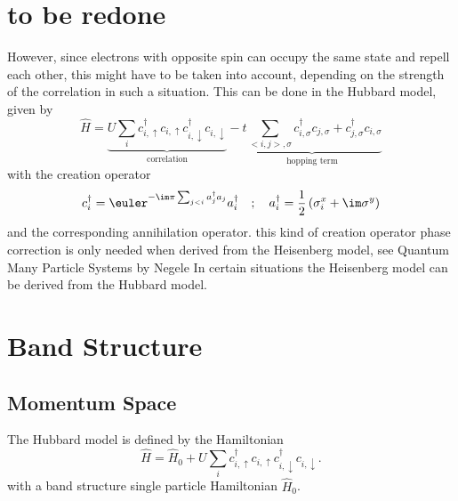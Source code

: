 \documentclass[a4paper,10pt]{report}
\begin{document}
\section{to be redone}

However, since electrons with opposite spin can occupy the same state and repell each other, this might have to be taken into account, depending on the 
strength of the correlation in such a situation. 
This can be done in the Hubbard model, given by
\begin{equation}
 \hat{H} = \underbrace{U \sum_i c^{\dagger}_{i,\uparrow}c_{i,\uparrow} c^{\dagger}_{i,\downarrow}c_{i,\downarrow} }_{\text{correlation}}
	    -\underbrace{t \sum_{<i,j>,\sigma} c^{\dagger}_{i,\sigma}c_{j,\sigma} + c^{\dagger}_{j,\sigma}c_{i,\sigma} }_{\text{hopping term}}
\end{equation}
with the creation operator 
\begin{equation}
 c^{\dagger}_{i} = \euler^{-\im\pi \sum_{j<i} a^{\dagger}_j a_j } a^{\dagger}_i\quad ; \quad a^{\dagger}_i = \frac12 \left( \sigma^x_i + \im \sigma^y \right)
\end{equation}
and the corresponding annihilation operator. 
 this kind of creation operator phase correction is only needed when derived from the Heisenberg model, see Quantum Many Particle Systems by Negele
In certain situations the Heisenberg model can be derived from the Hubbard model. 

\section{Band Structure}


\subsection{Momentum Space}

The Hubbard model is defined by the Hamiltonian
\begin{equation}
 \hat{H} = \hat{H}_0
	   + U \sum_i c^{\dagger}_{i,\uparrow}c_{i,\uparrow} c^{\dagger}_{i,\downarrow}c_{i,\downarrow} 
	    . \label{Hubbard_space}
\end{equation}
with a band structure single particle Hamiltonian $\hat{H}_0$.
\end{document}
